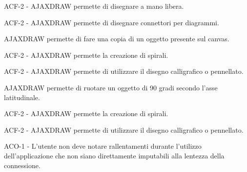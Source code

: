 \begin{elenconumerato}{\subsubsecindent}
\item{ACF-2 - AJAXDRAW permette di disegnare a mano libera.}
\item{ACF-2 - AJAXDRAW permette di disegnare connettori per diagrammi.}
\item{ AJAXDRAW permette di fare una copia di un oggetto presente sul canvas.}
\end{elenconumerato}

\begin{elenconumerato}{\subsubsecindent}
\item{ACF-2 - AJAXDRAW permette la creazione di spirali.}
\item{ACF-2 - AJAXDRAW permette di utilizzare il disegno calligrafico o pennellato.}
\item{ AJAXDRAW permette di ruotare un oggetto di 90 gradi secondo l'asse latitudinale.}
\end{elenconumerato}

\begin{elenconumerato}{\subsubsecindent}
\item{ACF-2 - AJAXDRAW permette la creazione di spirali.}
\item{ACF-2 - AJAXDRAW permette di utilizzare il disegno calligrafico o pennellato.}
\end{elenconumerato}

\begin{elenconumerato}{\subsubsecindent}
\item ACO-1 - L'utente non deve notare rallentamenti durante l'utilizzo dell'applicazione che non siano direttamente imputabili alla lentezza della connessione.
\end{elenconumerato}

